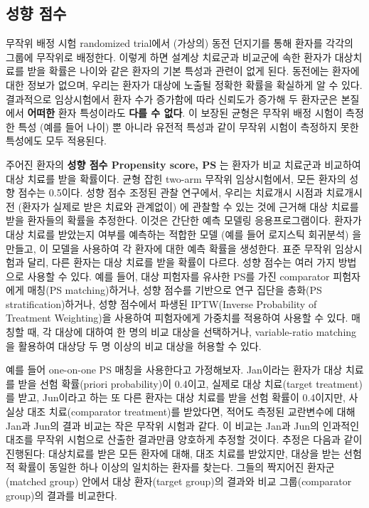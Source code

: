 \documentclass[11pt]{book}
\theoremstyle{definition}
\theoremstyle{definition}
\theoremstyle{definition}
\theoremstyle{remark}
\begin{document}
\subsection{성향 점수}\label{-}


무작위 배정 시험 randomized trial에서 (가상의) 동전 던지기를 통해 환자를
각각의 그룹에 무작위로 배정한다. 이렇게 하면 설계상 치료군과 비교군에
속한 환자가 대상치료를 받을 확률은 나이와 같은 환자의 기본 특성과 관련이
없게 된다. 동전에는 환자에 대한 정보가 없으며, 우리는 환자가 대상에
노출될 정확한 확률을 확실하게 알 수 있다. 결과적으로 임상시험에서 환자
수가 증가함에 따라 신뢰도가 증가해 두 환자군은 본질에서 \textbf{어떠한}
환자 특성이라도 \textbf{다를 수 없다}. 이 보장된 균형은 무작위 배정
시험이 측정한 특성 (예를 들어 나이) 뿐 아니라 유전적 특성과 같이 무작위
시험이 측정하지 못한 특성에도 모두 적용된다. 

주어진 환자의 \textbf{성향 점수 Propensity score, PS} 는 환자가 비교
치료군과 비교하여 대상 치료를 받을 확률이다. \citep{rosenbaum_1983} 균형
잡힌 two-arm 무작위 임상시험에서, 모든 환자의 성향 점수는 0.5이다. 성향
점수 조정된 관찰 연구에서, 우리는 치료개시 시점과 치료개시 전 (환자가
실제로 받은 치료와 관계없이) 에 관찰할 수 있는 것에 근거해 대상 치료를
받을 환자들의 확률을 추정한다. 이것은 간단한 예측 모델링
응용프로그램이다. 환자가 대상 치료를 받았는지 여부를 예측하는 적합한
모델 (예를 들어 로지스틱 회귀분석) 을 만들고, 이 모델을 사용하여 각
환자에 대한 예측 확률을 생성한다. 표준 무작위 임상시험과 달리, 다른
환자는 대상 치료를 받을 확률이 다르다. 성향 점수는 여러 가지 방법으로
사용할 수 있다. 예를 들어, 대상 피험자를 유사한 PS를 가진 comparator
피험자에게 매칭(PS matching)하거나, 성향 점수를 기반으로 연구 집단을
층화(PS stratification)하거나, 성향 점수에서 파생된 IPTW(Inverse
Probability of Treatment Weighting)을 사용하여 피험자에게 가중치를
적용하여 사용할 수 있다. 매칭할 때, 각 대상에 대하여 한 명의 비교 대상을
선택하거나, variable-ratio matching을 활용하여 대상당 두 명 이상의 비교
대상을 허용할 수 있다. \citep{rassen_2012} 

예를 들어 one-on-one PS 매칭을 사용한다고 가정해보자. Jan이라는 환자가
대상 치료를 받을 선험 확률(priori probability)이 0.4이고, 실제로 대상
치료(target treatment)를 받고, Jun이라고 하는 또 다른 환자는 대상 치료를
받을 선험 확률이 0.4이지만, 사실상 대조 치료(comparator treatment)를
받았다면, 적어도 측정된 교란변수에 대해 Jan과 Jun의 결과 비교는 작은
무작위 시험과 같다. 이 비교는 Jan과 Jun의 인과적인 대조를 무작위
시험으로 산출한 결과만큼 양호하게 추정할 것이다. 추정은 다음과 같이
진행된다: 대상치료를 받은 모든 환자에 대해, 대조 치료를 받았지만, 대상을
받는 선험적 확률이 동일한 하나 이상의 일치하는 환자를 찾는다. 그들의
짝지어진 환자군(matched group) 안에서 대상 환자(target group)의 결과와
비교 그룹(comparator group)의 결과를 비교한다.
\end{document}

